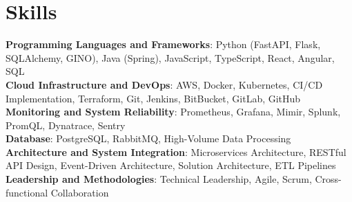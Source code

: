 \documentclass[letterpaper,11pt]{article}
\begin{document}
\section{Skills}
 \begin{itemize}[leftmargin=0.15in, label={}]
    \small{\item{
         \textbf{Programming Languages and Frameworks}{: Python (FastAPI, Flask, SQLAlchemy, GINO), Java (Spring), JavaScript, TypeScript, React, Angular, SQL} \\
         \textbf{Cloud Infrastructure and DevOps}{: AWS, Docker, Kubernetes, CI/CD Implementation, Terraform, Git, Jenkins, BitBucket, GitLab, GitHub} \\
         \textbf{Monitoring and System Reliability}{: Prometheus, Grafana, Mimir, Splunk, PromQL, Dynatrace, Sentry} \\
         \textbf{Database}{: PostgreSQL, RabbitMQ, High-Volume Data Processing} \\
        \textbf{Architecture and System Integration}{: Microservices Architecture, RESTful API Design, Event-Driven Architecture, Solution Architecture,  ETL Pipelines} \\
        \textbf{Leadership and Methodologies}{: Technical Leadership,  Agile, Scrum, Cross-functional Collaboration}
    }}
 \end{itemize}


\end{document}
